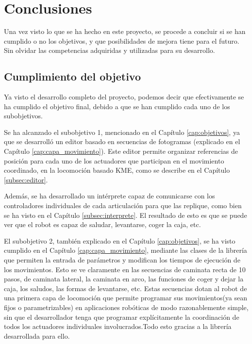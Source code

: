 \chapter{Conclusiones}\label{cap:conclusiones}

Una vez visto lo que se ha hecho en este proyecto, se procede a concluir si se han cumplido o no los objetivos, y que posibilidades de mejora tiene para el futuro. Sin olvidar las competencias adquiridas y utilizadas para su desarrollo.

\section{Cumplimiento del objetivo}

Ya visto el desarrollo completo del proyecto, podemos decir que efectivamente se ha cumplido el objetivo final, debido a que se han cumplido cada uno de los subobjetivos.

Se ha alcanzado el subobjetivo 1, mencionado en el Capítulo \ref{cap:objetivos}, ya que se desarrolló un editor basado en secuencias de fotogramas (explicado en el Capítulo \ref{cap:capa_movimiento}). Este editor permite organizar referencias de posición para cada uno de los actuadores que participan en el movimiento coordinado, en la locomoción basado KME, como se describe en el Capítulo \ref{subsec:editor}.

Además, se ha desarrollado un intérprete capaz de comunicarse con los controladores individuales de cada articulación para que las replique, como bien se ha visto en el Capítulo \ref{subsec:interprete}. El resultado de esto es que se puede ver que el robot es capaz de saludar, levantarse, coger la caja, etc.

El subobjetivo 2, también explicado en el  Capítulo \ref{cap:objetivos}, se ha visto cumplido en el Capítulo \ref{cap:capa_movimiento}, mediante las clases de la librería que permiten la entrada de parámetros y modifican los tiempos de ejecución de los movimientos. Esto se ve claramente en las secuencias de caminata recta de 10 pasos, de caminata lateral, la caminata en arco, las funciones de coger y dejar la caja, los saludos, las formas de levantarse, etc. Estas secuencias dotan al robot de una primera capa de locomoción que permite programar sus movimientos(ya sean fijos o parametrizables) en aplicaciones robóticas de modo razonablemente simple, sin que el desarrollador tenga que programar explícitamente la coordinación de todos los actuadores individuales involucrados.Todo esto gracias a la librería desarrollada para ello.

